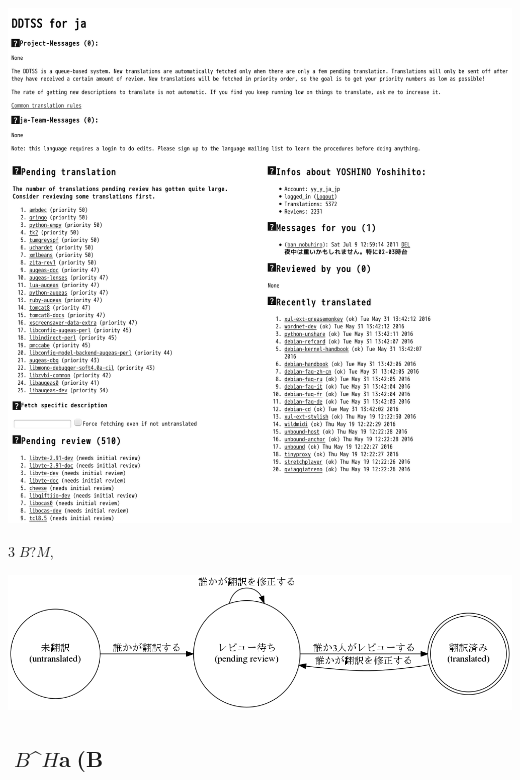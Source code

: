 \documentclass[mingoth,a4paper]{jsarticle}
\begin{document}
{{{{{{{{{{{{{{{{{   \begin{center} 
  \includegraphics[width=0.9\hsize]{image201606/ddtss_mono.png}
   \end{center}

  3$B?M$,%

  \begin{center} 
  \includegraphics[width=0.9\hsize]{image201606/ddtss-flow_mono.png}
   \end{center}

\subsection{$B$^$H$a(B}

}}}}}}}}}}}}}}}}}
\end{document}
